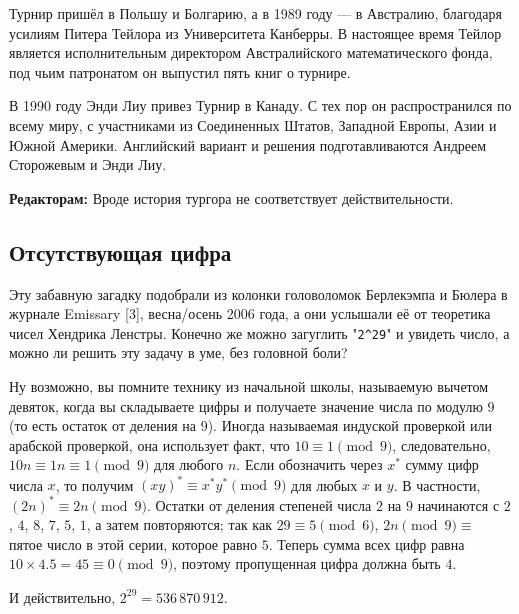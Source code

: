 Турнир пришёл в Польшу и Болгарию, а в 1989 году --- в Австралию, благодаря усилиям Питера Тейлора из Университета Канберры.
В настоящее время Тейлор является исполнительным директором Австралийского математического фонда, под чьим патронатом он выпустил пять книг о турнире.

В 1990 году Энди Лиу привез Турнир в Канаду.
С тех пор он распространился по всему миру, с участниками из Соединенных Штатов, Западной Европы, Азии и Южной Америки.
Английский вариант и решения подготавливаются Андреем Сторожевым и Энди Лиу.

\begin{addedbytheeditors}
\textbf{Редакторам:} Вроде история тургора не соответствует действительности.
\end{addedbytheeditors}

\subsection*{Отсутствующая цифра}

Эту забавную загадку подобрали из колонки головоломок Берлекэмпа и Бюлера в журнале Emissary [3], весна/осень 2006 года,
а они услышали её от теоретика чисел Хендрика Ленстры.
Конечно же можно загуглить "\texttt{2\^{}29}" и увидеть число, а можно ли решить эту задачу в уме, без головной боли?

Ну возможно, вы помните технику из начальной школы, называемую вычетом девяток, когда вы складываете цифры и получаете значение числа по модулю 9 (то есть остаток от деления на 9).
Иногда называемая индуской проверкой или арабской проверкой, она использует факт, что $10 \equiv 1 \pmod 9$, следовательно, $10n \equiv 1n \equiv 1 \pmod 9$ для любого $n$.
Если обозначить через $x^*$ сумму цифр числа $x$, то получим $(xy)^* \equiv x^* y^* \pmod 9$ для любых $x$ и $y$.
В частности, $(2n)^* \equiv 2n \pmod 9$.
Остатки от деления степеней числа $2$ на $9$ начинаются с $2$, $4$, $8$, $7$, $5$, $1$, а затем повторяются; так как $29 \equiv 5 \pmod 6$, $2n \pmod 9 \equiv$ пятое число в этой серии, которое равно $5$.
Теперь сумма всех цифр равна $10 \times 4.5 = 45 \equiv 0 \pmod 9$, поэтому пропущенная цифра должна быть $4$.

И действительно, $2^29 = 536\,870\,912$.
